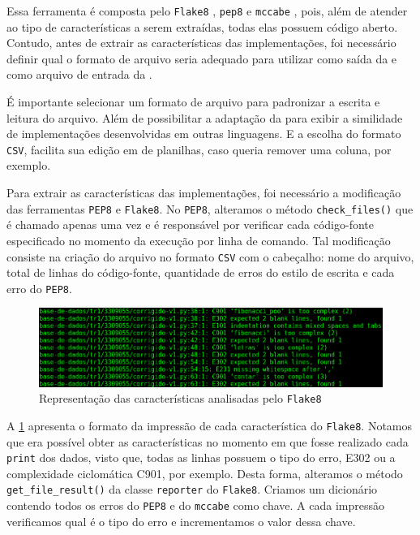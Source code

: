 			Essa ferramenta é composta pelo \texttt{Flake8} \cite{flake8}, \texttt{pep8}
			\cite{pep8} e \texttt{mccabe} \cite{mccabe2013}, pois, além de atender ao tipo
			de características a serem extraídas, todas elas possuem código aberto. Contudo,
			antes de extrair as características das implementações, foi necessário definir
			qual o formato de arquivo seria adequado para utilizar como saída da
			 e como arquivo de entrada da .

			É importante selecionar um formato de arquivo para padronizar a escrita
			e leitura do arquivo. Além de possibilitar a adaptação da 
			para exibir a similidade de implementações desenvolvidas em outras linguagens.
			E a escolha do formato \texttt{CSV}, facilita sua edição em 
			de planilhas, caso queria remover uma coluna, por exemplo.
			
			Para extrair as características das implementações, foi necessário a modificação
			das ferramentas \texttt{PEP8} e \texttt{Flake8}. No \texttt{PEP8}, alteramos o
			método \texttt{check\_files()} que é chamado apenas uma vez e é responsável por
			verificar cada código-fonte especificado no momento da execução por linha de
			comando. Tal modificação consiste na criação do arquivo no formato \texttt{CSV}
			com o cabeçalho: nome do arquivo, total de linhas do código-fonte, quantidade
			de erros do estilo de escrita e cada erro do \texttt{PEP8}.
			
			\begin{figure}[h]
				\centering
				\includegraphics[width=1\linewidth]{imagem/flake8}
				\caption{Representação das características analisadas pelo \texttt{Flake8}}
				\label{fig:flake8}
			\end{figure}
			
			A \cref{fig:flake8} apresenta o formato da impressão de cada característica do
			\texttt{Flake8}. Notamos que era possível obter as características no momento em
			que fosse realizado cada \texttt{print} dos dados, visto que, todas as linhas
			possuem o tipo do erro, E302 ou a complexidade ciclomática C901, por exemplo.
			Desta forma, alteramos o método \texttt{get\_file\_result()} da classe
			\texttt{reporter} do \texttt{Flake8}. Criamos um dicionário contendo todos os
			erros do \texttt{PEP8} e do \texttt{mccabe} como chave. A cada impressão
			verificamos qual é o tipo do erro e incrementamos o valor dessa chave.
			
